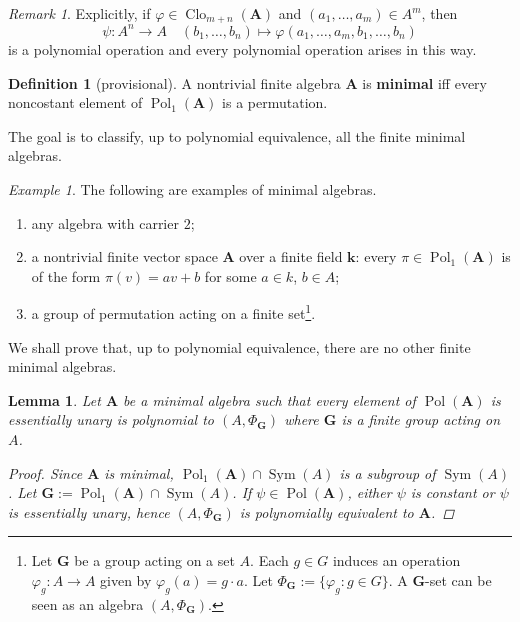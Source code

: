 \documentclass{amsart}
\theoremstyle{plain}
\newtheorem{lemma}[theorem]{Lemma}
\theoremstyle{definition}
\newtheorem{definition}[theorem]{Definition}
\theoremstyle{remark}
\newtheorem{remark}[theorem]{Remark}
\newtheorem{example}[theorem]{Example}
\def\phi{\varphi}
\DeclareMathOperator{\Clo}{Clo}
\DeclareMathOperator{\Pol}{Pol}
\DeclareMathOperator{\Sym}{Sym}
\begin{document}
\begin{remark}
    Explicitly, if $\phi \in \Clo_{m+n}(\mathbf{A})$ and $(a_1, \ldots, a_m) \in A^m$, then 
    \begin{equation*}
        \psi: A^n \to A \quad (b_1, \ldots, b_n) \mapsto \phi(a_1, \ldots, a_m,b_1, \ldots, b_n)
    \end{equation*}
is a polynomial operation and every polynomial operation arises in this way. 
\end{remark}

\begin{definition}
    [provisional]
    A nontrivial finite algebra $\mathbf{A}$ is \textbf{minimal} iff every noncostant element of $\Pol_1(\mathbf{A})$ is a permutation.
\end{definition}

The goal is to classify, up to polynomial equivalence, all the finite minimal algebras. 

\begin{example}
    The following are examples of minimal algebras. 
    \begin{enumerate}
        \item any algebra with carrier $2$; 
        \item a nontrivial finite vector space $\mathbf{A}$ over a finite field $\mathbf{k}$: every $\pi \in \Pol_1(\mathbf{A})$ is of the form $\pi(v)=av+b$ for some $a \in k$, $b \in A$; 
        \item a group of permutation acting on a finite set\footnote{Let $\mathbf{G}$ be a group acting on a set $A$.  
        Each $g \in G$ induces an operation $\phi_g: A \to A$ given by $\phi_g(a)=g \cdot a$. 
        Let $\Phi_\mathbf{G}:=\{\phi_g: g \in G\}$. 
        A $\mathbf{G}$-set can be seen as an algebra $(A, \Phi_\mathbf{G})$.}.
    \end{enumerate}
\end{example}

We shall prove that, up to polynomial equivalence, there are no other finite minimal algebras. 

\begin{lemma}
    Let $\mathbf{A}$ be a minimal algebra such that every element of $\Pol(\mathbf{A})$ is essentially unary is polynomial to $(A, \Phi_{\mathbf{G}})$ where $\mathbf{G}$ is a finite group acting on $A$. 
    \begin{proof}
        Since $\mathbf{A}$ is minimal, $\Pol_1(\mathbf{A}) \cap \Sym(A)$ is a subgroup of $\Sym(A)$. 
        Let $\mathbf{G}:=\Pol_1(\mathbf{A}) \cap \Sym(A)$. 
        If $\psi \in \Pol(\mathbf{A})$, either $\psi$ is constant or $\psi$ is essentially unary, hence $(A, \Phi_{\mathbf{G}})$ is polynomially equivalent to $\mathbf{A}$. 
    \end{proof}
\end{lemma}
\end{document}
